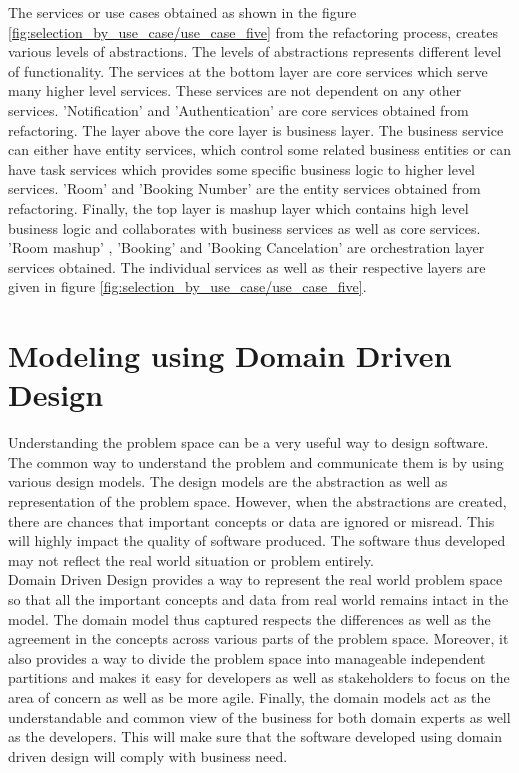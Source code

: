 The services or use cases obtained as shown in the figure \ref{fig:selection_by_use_case/use_case_five} from the refactoring process, creates various levels of abstractions. The levels of abstractions represents different level of functionality. The services at the bottom layer are core services which serve many higher level services. These services are not dependent on any other services. 'Notification' and 'Authentication' are core services obtained from refactoring. The layer above the core layer is business layer. The business service can either have entity services, which control some related business entities or can have task services which provides some specific business logic to higher level services. 'Room' and 'Booking Number' are the entity services obtained from refactoring. Finally, the top layer is mashup layer which contains high level business logic and collaborates with business services as well as core services. 'Room mashup' , 'Booking' and 'Booking Cancelation' are orchestration layer services obtained. The individual services as well as their respective layers are given in figure \ref{fig:selection_by_use_case/use_case_five}. \cite{Fareghzadeh:2008aa}\cite{Emig:2015aa}\cite{Zimmermann:2005aa}

\section{Modeling using Domain Driven Design}\label{section:domain_driven_design/introduction}
Understanding the problem space can be a very useful way to design software. The common way to understand the problem and communicate them is by using various design models. The design models are the abstraction as well as representation of the problem space. However, when the abstractions are created, there are chances that important concepts or data are ignored or misread. This will highly impact the quality of software produced. The software thus developed may not reflect the real world situation or problem entirely.
\\
Domain Driven Design provides a way to represent the real world problem space so that all the important concepts and data from real world remains intact in the model. The domain model thus captured respects the differences as well as the agreement in the concepts across various parts of the problem space. Moreover, it also provides a way to divide the problem space into manageable independent partitions and makes it easy for developers as well as stakeholders to focus on the area of concern as well as be more agile. Finally, the domain models act as the understandable and common view of the business for both domain experts as well as the developers. This will make sure that the software developed using domain driven design will comply with business need.\cite{Evans:2003aa}\cite{Vernon:2013aa}
\\

